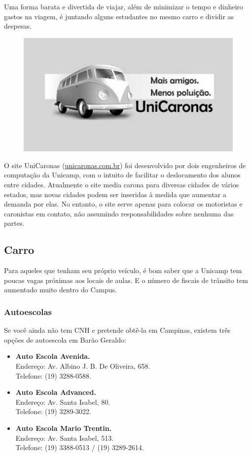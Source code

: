 Uma forma barata e divertida de viajar, além de minimizar o tempo e dinheiro
gastos na viagem, é juntando alguns estudantes no mesmo carro e dividir as
despesas.
\begin{figure}[h!]
    \centering
    \includegraphics[scale=0.55,keepaspectratio=true]{img/imgs/8-transporte/unicaronas.jpg}
\end{figure}


O site UniCaronas (\url{unicaronas.com.br}) foi desenvolvido por dois
engenheiros de computação da Unicamp, com o intuito de facilitar o deslocamento
dos alunos entre cidades. Atualmente o site media carona para diversas cidades
de vários estados, mas novas cidades podem ser inseridas à medida que aumentar
a demanda por elas. No entanto, o site serve apenas para colocar os motoristas
e caronistas em contato, não assumindo responsabilidades sobre nenhuma das
partes.

\subsection{Carro}

Para aqueles que tenham seu próprio veículo, é bom saber que a Unicamp tem
poucas vagas próximas aos locais de aulas. E o número de fiscais de trânsito tem
aumentado muito dentro do Campus.

\subsubsection{Autoescolas}

Se você ainda não tem CNH e pretende obtê-la em Campinas, existem três opções de
autoescola em Barão Geraldo:

\begin{itemize}
\item  \textbf{Auto Escola Avenida.}
		\\Endereço: Av. Albino J. B. De Oliveira, 658.
		\\Telefone: (19) 3288-0588.

\item  \textbf{Auto Escola Advanced.}
		\\Endereço: Av. Santa Isabel, 80.
		\\Telefone: (19) 3289-3022.

\item  \textbf{Auto Escola Mario Trentin.}
		\\Endereço: Av. Santa Isabel, 513.
		\\Telefone: (19) 3388-0513 / (19) 3289-2614.
\end{itemize}


